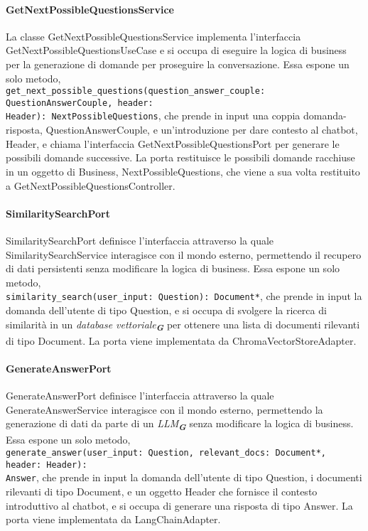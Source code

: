 \paragraph{GetNextPossibleQuestionsService}
\label{sec:get_next_possible_questions_service}
La classe GetNextPossibleQuestionsService implementa l'interfaccia GetNextPossibleQuestionsUseCase e si occupa di eseguire la logica di business per la generazione di domande per proseguire la conversazione. Essa espone un solo metodo,\\ \texttt{get\_next\_possible\_questions(question\_answer\_couple: QuestionAnswerCouple, header:\\ Header): NextPossibleQuestions}, che prende in input una coppia domanda-risposta, QuestionAnswerCouple, e un'introduzione per dare contesto al chatbot, Header, e chiama l'interfaccia GetNextPossibleQuestionsPort per generare le possibili domande successive. La porta restituisce le possibili domande racchiuse in un oggetto di Business, NextPossibleQuestions, che viene a sua volta restituito a GetNextPossibleQuestionsController.

\newpage


\label{sec:port}

\paragraph{SimilaritySearchPort}
\label{sec:similarity_search_port}
SimilaritySearchPort definisce l'interfaccia attraverso la quale SimilaritySearchService interagisce con il mondo esterno, permettendo il recupero di dati persistenti senza modificare la logica di business. Essa espone un solo metodo,\\ \texttt{similarity\_search(user\_input: Question): Document*}, che prende in input la domanda dell'utente di tipo Question, e si occupa di svolgere la ricerca di similarità in un \emph{database vettoriale}\textsubscript{\textbf{\textit{G}}} per ottenere una lista di documenti rilevanti di tipo Document. La porta viene implementata da ChromaVectorStoreAdapter.

\paragraph{GenerateAnswerPort}
\label{sec:generate_answer_port}
GenerateAnswerPort definisce l'interfaccia attraverso la quale GenerateAnswerService interagisce con il mondo esterno, permettendo la generazione di dati da parte di un \emph{LLM}\textsubscript{\textbf{\textit{G}}} senza modificare la logica di business. Essa espone un solo metodo,\\ \texttt{generate\_answer(user\_input: Question, relevant\_docs: Document*, header: Header):\\ Answer}, che prende in input la domanda dell'utente di tipo Question, i documenti rilevanti di tipo Document, e un oggetto Header che fornisce il contesto introduttivo al chatbot, e si occupa di generare una risposta di tipo Answer. La porta viene implementata da LangChainAdapter.


